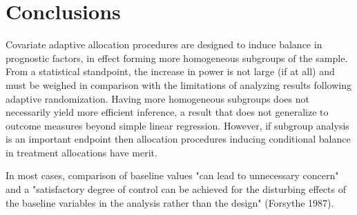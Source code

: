 \section{Conclusions}
Covariate adaptive allocation procedures are designed to induce balance in prognostic factors, in effect forming more homogeneous subgroups of the sample. 
From a statistical standpoint, the increase in power is not large (if at all) and must be weighed in comparison with the limitations of analyzing results following adaptive randomization.
Having more homogeneous subgroups does not necessarily yield more efficient inference, a result that does not generalize to outcome measures beyond simple linear regression.
However, if subgroup analysis is an important endpoint then allocation procedures inducing conditional balance in treatment allocations have merit.

In most cases, comparison of baseline values "can lead to unnecessary concern" and a "satisfactory degree of control can be achieved for the disturbing effects of the baseline variables in the analysis rather than the design" (Forsythe 1987).



